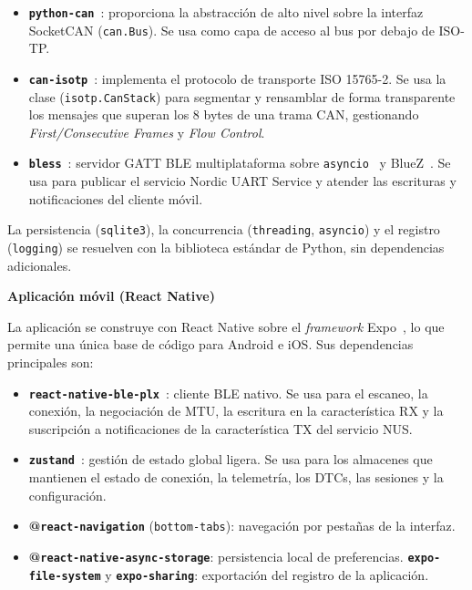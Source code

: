 \begin{itemize}
    \item \textbf{\texttt{python-can}}~\cite{Twiss23-pythoncan}: proporciona la abstracción de alto nivel sobre la interfaz SocketCAN (\texttt{can.Bus}). Se usa como capa de acceso al bus por debajo de ISO-TP.
    \item \textbf{\texttt{can-isotp}}~\cite{Menager23-isotp}: implementa el protocolo de transporte ISO 15765-2. Se usa la clase (\texttt{isotp.CanStack}) para segmentar y rensamblar de forma transparente los mensajes que superan los 8 bytes de una trama CAN, gestionando \textit{First/Consecutive Frames} y \textit{Flow Control}.
    \item \textbf{\texttt{bless}}~\cite{Bless_lib}: servidor GATT BLE multiplataforma sobre \texttt{asyncio}~\cite{Python_asyncio} y BlueZ~\cite{BlueZ}. Se usa para publicar el servicio Nordic UART Service y atender las escrituras y notificaciones del cliente móvil.
\end{itemize}

La persistencia (\texttt{sqlite3}), la concurrencia (\texttt{threading}, \texttt{asyncio}) y el registro (\texttt{logging}) se resuelven con la biblioteca estándar de Python, sin dependencias adicionales.

\medskip
\noindent\textbf{Aplicación móvil (React Native)}

La aplicación se construye con React Native sobre el \textit{framework} Expo~\cite{Expo_docs}, lo que permite una única base de código para Android e iOS. Sus dependencias principales son:

\begin{itemize}
    \item \textbf{\texttt{react-\allowbreak{}native-\allowbreak{}ble-\allowbreak{}plx}}~\cite{ReactNativeBLEPLX}: cliente BLE nativo. Se usa para el escaneo, la conexión, la negociación de MTU, la escritura en la característica RX y la suscripción a notificaciones de la característica TX del servicio NUS.
    \item \textbf{\texttt{zustand}}~\cite{Zustand_lib}: gestión de estado global ligera. Se usa para los almacenes que mantienen el estado de conexión, la telemetría, los DTCs, las sesiones y la configuración.
    \item \textbf{@\texttt{react-navigation}} (\texttt{bottom-tabs}): navegación por pestañas de la interfaz.
    \item \textbf{@\texttt{react-native-async-storage}}: persistencia local de preferencias. \textbf{\texttt{expo-file-system}} y \textbf{\texttt{expo-sharing}}: exportación del registro de la aplicación.
\end{itemize}


